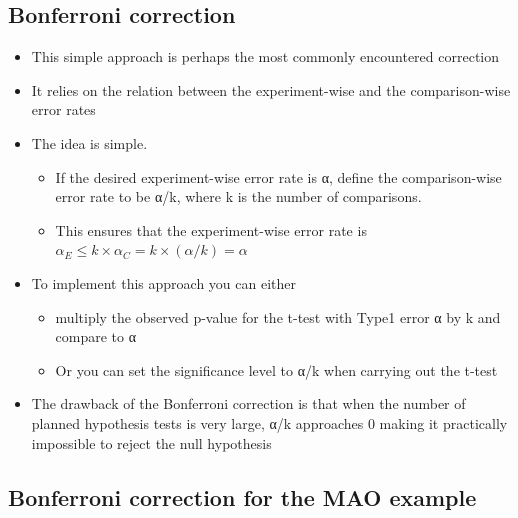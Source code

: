 \documentclass[
]{book}
\providecommand{\tightlist}{%
  \setlength{\itemsep}{0pt}\setlength{\parskip}{0pt}}
\begin{document}
\hypertarget{bonferroni-correction}{%
\subsection{Bonferroni correction}\label{bonferroni-correction}}

\begin{itemize}
\tightlist
\item
  This simple approach is perhaps the most commonly encountered correction
\item
  It relies on the relation between the experiment-wise and the comparison-wise error rates
\item
  The idea is simple.

  \begin{itemize}
  \tightlist
  \item
    If the desired experiment-wise error rate is α, define the comparison-wise error rate to be α/k, where k is the number of comparisons.
  \item
    This ensures that the experiment-wise error rate is\\
    \(α_E ≤ k × α_C = k × (α/k) = α\)
  \end{itemize}
\item
  To implement this approach you can either

  \begin{itemize}
  \tightlist
  \item
    multiply the observed p-value for the t-test with Type1 error α by k and compare to α
  \item
    Or you can set the significance level to α/k when carrying out the t-test
  \end{itemize}
\item
  The drawback of the Bonferroni correction is that when the number of planned hypothesis tests is very large, α/k approaches 0 making it practically impossible to reject the null hypothesis
\end{itemize}

\hypertarget{bonferroni-correction-for-the-mao-example}{%
\subsection{Bonferroni correction for the MAO example}\label{bonferroni-correction-for-the-mao-example}}
\end{document}
